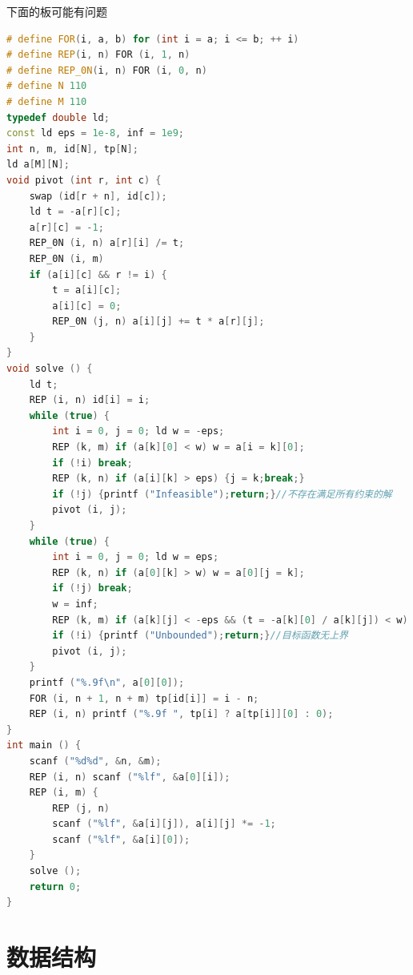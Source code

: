 \documentclass[UTF8,a4paper,titlepage]{ctexart}
\begin{document}
下面的板可能有问题
\begin{lstlisting}[language=C++]
# define FOR(i, a, b) for (int i = a; i <= b; ++ i)
# define REP(i, n) FOR (i, 1, n)
# define REP_0N(i, n) FOR (i, 0, n)
# define N 110
# define M 110
typedef double ld;
const ld eps = 1e-8, inf = 1e9;
int n, m, id[N], tp[N];
ld a[M][N];
void pivot (int r, int c) {
    swap (id[r + n], id[c]);
    ld t = -a[r][c];
    a[r][c] = -1;
    REP_0N (i, n) a[r][i] /= t;
    REP_0N (i, m)
    if (a[i][c] && r != i) {
        t = a[i][c];
        a[i][c] = 0;
        REP_0N (j, n) a[i][j] += t * a[r][j];
    }
}
void solve () {
    ld t;
    REP (i, n) id[i] = i;
    while (true) {
        int i = 0, j = 0; ld w = -eps;
        REP (k, m) if (a[k][0] < w) w = a[i = k][0];
        if (!i) break;
        REP (k, n) if (a[i][k] > eps) {j = k;break;}
        if (!j) {printf ("Infeasible");return;}//不存在满足所有约束的解
        pivot (i, j);
    }
    while (true) {
        int i = 0, j = 0; ld w = eps;
        REP (k, n) if (a[0][k] > w) w = a[0][j = k];
        if (!j) break;
        w = inf;
        REP (k, m) if (a[k][j] < -eps && (t = -a[k][0] / a[k][j]) < w) w = t, i = k;
        if (!i) {printf ("Unbounded");return;}//目标函数无上界
        pivot (i, j);
    }
    printf ("%.9f\n", a[0][0]);
    FOR (i, n + 1, n + m) tp[id[i]] = i - n;
    REP (i, n) printf ("%.9f ", tp[i] ? a[tp[i]][0] : 0);
}
int main () {
    scanf ("%d%d", &n, &m);
    REP (i, n) scanf ("%lf", &a[0][i]);
    REP (i, m) {
        REP (j, n)
        scanf ("%lf", &a[i][j]), a[i][j] *= -1;
        scanf ("%lf", &a[i][0]);
    }
    solve ();
    return 0;
}

\end{lstlisting}

\section{数据结构}
\end{document}
